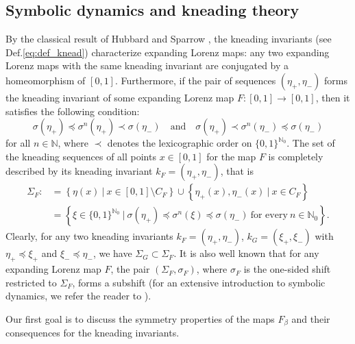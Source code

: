 \documentclass[10pt,reqno]{amsart}
\theoremstyle{plain}
\theoremstyle{assumption}
\theoremstyle{notation}
\theoremstyle{claim}
\theoremstyle{conj}
\theoremstyle{theorem}
\theoremstyle{proposition}
\theoremstyle{corollary}
\begin{document}
\subsection{Symbolic dynamics and kneading theory}\label{subsec:symbolic_dynamics}
By the classical result of Hubbard and Sparrow \cite{HubSpar}, the kneading invariants (see Def.\eqref{eq:def_knead}) characterize expanding Lorenz maps: any two expanding Lorenz maps with the same kneading invariant are conjugated by a homeomorphism of $[0,1]$. Furthermore, if the pair of sequences $(\eta_+,\eta_-)$ forms the kneading invariant of some expanding Lorenz map $F\colon[0,1]\to[0,1]$, then it satisfies the following condition:
\begin{equation}
    \label{eq:kneading_cond}  \sigma(\eta_+)\preccurlyeq\sigma^n(\eta_+)\prec\sigma(\eta_-)\quad\text{and}\quad\sigma(\eta_+)\prec\sigma^n(\eta_-)\preccurlyeq\sigma(\eta_-)
\end{equation}
for all $n\in\mathbb{N}$, where $\prec$ denotes the lexicographic order on $\{0,1\}^{\mathbb{N}_0}$. The set of the kneading sequences of all points $x\in[0,1]$ for the map $F$ is completely described by its kneading invariant $k_F=(\eta_+,\eta_-)$, that is
\begin{equation}\label{eq:symbol_space}
    \begin{aligned}
\Sigma_F:&=\left\{\eta(x)\:|\:x\in[0,1]\setminus C_F\right\}\cup\left\{\eta_+(x),\eta_-(x)\:|\:x\in C_F\right\}\\
&=\left\{\xi\in\{0,1\}^{\mathbb{N}_0}\:|\: \sigma(\eta_+)\preccurlyeq\sigma^n(\xi)\preccurlyeq\sigma(\eta_-)\ \text{for every}\ n\in\mathbb{N}_0\right\}.
\end{aligned}
\end{equation}
Clearly, for any two kneading invariants $k_F=(\eta_+,\eta_-)$, $k_G=(\xi_+,\xi_-)$ with $\eta_+\preccurlyeq\xi_+$ and $\xi_-\preccurlyeq\eta_-$, we have $\Sigma_G\subset\Sigma_F$. It is also well known that for any expanding Lorenz map $F$, the pair $(\Sigma_F,\sigma_F)$, where $\sigma_F$ is the one-sided shift restricted to $\Sigma_F$, forms a subshift (for an extensive introduction to symbolic dynamics, we refer the reader to \cite{Kurka}).

Our first goal is to discuss the symmetry properties of the maps $F_{\beta}$ and their consequences for the kneading invariants.
\end{document}
